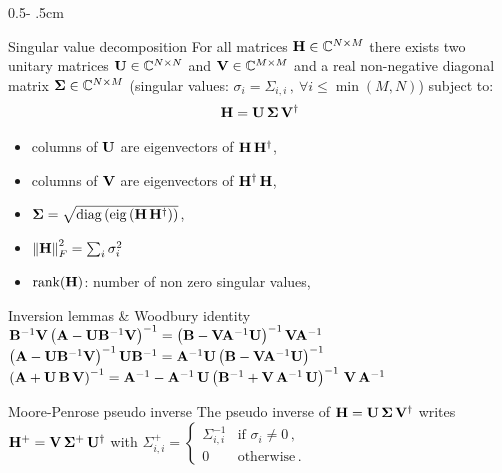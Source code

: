 \documentclass[a4paper]{cookbook}
\begin{document}
\begin{frame}
\begin{columns}[onlytextwidth]
\begin{column}{0.5\textwidth - .5cm}
    
    \begin{block}{Singular value decomposition}
    For all matrices $\mathbf{H}\in \mathbb{C}^{N\times M}$ there exists two unitary matrices $\mathbf{U} \in \mathbb{C}^{N\times N}$ and  $\mathbf{V} \in \mathbb{C}^{M\times M}$ and a real non-negative diagonal matrix $\mathbf{\Sigma} \in  \mathbb{C}^{N\times M}$ (singular values: $\sigma_i = \Sigma_{i,i}\,,\ \forall i\leq \min(M,N)$)  subject to:
    \begin{align*}
        \mathbf{H} = \mathbf{U}\,\mathbf{\Sigma}\,\mathbf{V}^{\dagger}
    \end{align*}
    \vspace{-2em}\begin{itemize}
        \item  columns of $\mathbf{U}$  are eigenvectors of $\mathbf{H}\,\mathbf{H}^{\dagger}$,  
        \item columns of  $\mathbf{V}$ are eigenvectors of $\mathbf{H}^{\dagger}\,\mathbf{H}$,  
        \item $\M{\Sigma} = \sqrt{\diag\left(\eig\left(\M{H}\,\M{H}\T\right)\right)} $,
        \item $\left\Vert \mathbf{H}\right\Vert^2_F = \sum_{i} \sigma_i^2 $
        \item $\rank(\M{H})$: number of non zero singular values,
    \end{itemize}
    \end{block}

    \begin{block}{Inversion lemmas \& Woodbury identity}
    $ \mathbf{B}^{-1}\mathbf{V} \left(\mathbf{A} - \mathbf{U}\mathbf{B}^{-1}\mathbf{V}\right)^{-1} = \left( \mathbf{B} - \mathbf{V}\mathbf{A}^{-1}\mathbf{U}\right)^{-1}\mathbf{V}\mathbf{A}^{-1}$\\
    $  \left(\mathbf{A} - \mathbf{U}\mathbf{B}^{-1}\mathbf{V}\right)^{-1}\mathbf{U}\mathbf{B}^{-1} = \mathbf{A}^{-1}\mathbf{U}\left( \mathbf{B} - \mathbf{V}\mathbf{A}^{-1}\mathbf{U}\right)^{-1}$\\
    $\left(\mathbf{A} + \mathbf{U}\,\mathbf{B}\,\mathbf{V} \right)^{-1} = \mathbf{A}^{-1} - \mathbf{A}^{-1}\,\mathbf{U}\left( \mathbf{B}^{-1} + \mathbf{V}\,\mathbf{A}^{-1}\,\mathbf{U}\right)^{-1}\,\mathbf{V}\,\mathbf{A}^{-1}$
    \end{block}
    
    \begin{block}{Moore-Penrose pseudo inverse}
    The pseudo inverse of $\mathbf{H} = \mathbf{U}\,\mathbf{\Sigma}\,\mathbf{V}^{\dagger}$ writes  $\mathbf{H}^+ = \mathbf{V}\,\mathbf{\Sigma}^+\,\mathbf{U}^{\dagger}$ with $\Sigma_{i,i}^+ = \left\{
                            \begin{array}{ll}
                              \Sigma^{-1}_{i,i} &   \text{if }\sigma_i\neq0 \,, \\
                              0 & \text{otherwise} \,.
                            \end{array}
                                  \right.$ 
                                  

\end{block}
\end{column}
\end{columns}
\end{frame}
\end{document}
